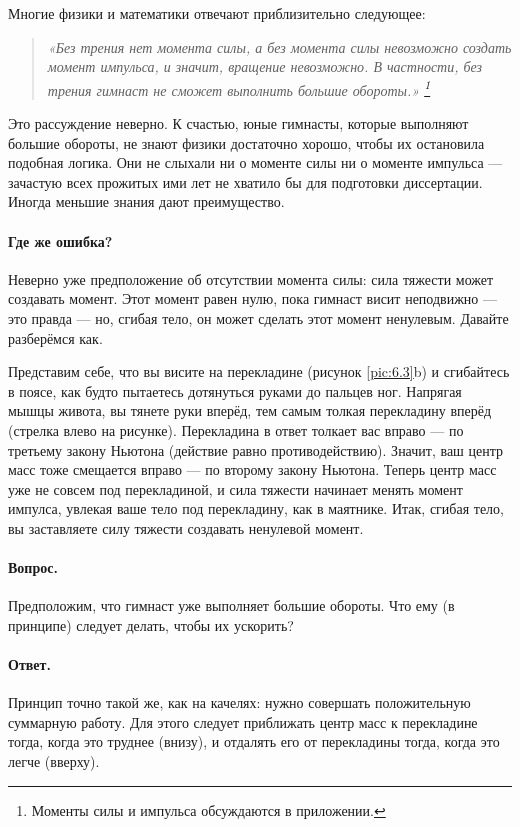 Многие физики и математики отвечают приблизительно следующее:
\begin{quote}
\emph{«Без трения нет момента силы, а без момента силы невозможно создать момент импульса,
и значит, вращение невозможно.
В частности, без трения гимнаст не сможет выполнить большие обороты.»
\footnote{Моменты силы и импульса обсуждаются в приложении.}}
\end{quote}

Это рассуждение неверно.
К счастью, юные гимнасты, которые выполняют большие обороты, не знают физики достаточно хорошо, чтобы их остановила подобная логика.
Они не слыхали ни о моменте силы ни о моменте импульса ---
зачастую всех прожитых ими лет не хватило бы для подготовки диссертации.
Иногда меньшие знания дают преимущество.

\paragraph{Где же ошибка?}
Неверно уже предположение об отсутствии момента силы: сила тяжести может создавать момент.
Этот момент равен нулю, пока гимнаст висит неподвижно --- это правда --- но, сгибая тело, он может сделать этот момент ненулевым.
Давайте разберёмся как.

Представим себе, что вы висите на перекладине (рисунок \ref{pic:6.3}b)
и сгибайтесь в поясе, как будто пытаетесь дотянуться руками до пальцев ног.
Напрягая мышцы живота, вы тянете руки вперёд, тем самым толкая перекладину вперёд (стрелка влево на рисунке).
Перекладина в ответ толкает вас вправо — по третьему закону Ньютона (действие равно противодействию).
Значит, ваш центр масс тоже смещается вправо — по второму закону Ньютона.
Теперь центр масс уже не совсем под перекладиной, и сила тяжести начинает менять момент импулса, увлекая ваше тело под перекладину, как в маятнике.
Итак, сгибая тело, вы заставляете силу тяжести создавать ненулевой момент.

\paragraph{Вопрос.}
Предположим, что гимнаст уже выполняет большие обороты.
Что ему (в принципе) следует делать, чтобы их ускорить?

\paragraph{Ответ.}
Принцип точно такой же, как на качелях: нужно совершать положительную суммарную работу.
Для этого следует приближать центр масс к перекладине тогда, когда это труднее (внизу), и отдалять его от перекладины тогда, когда это легче (вверху).

